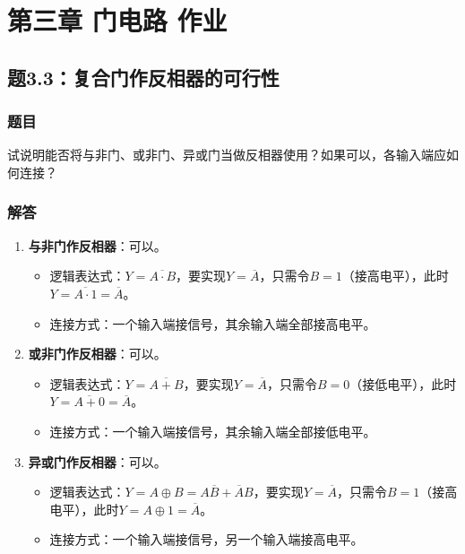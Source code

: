 
\section{第三章 门电路 作业}

\subsection{题3.3：复合门作反相器的可行性}
\subsubsection{题目}
试说明能否将与非门、或非门、异或门当做反相器使用？如果可以，各输入端应如何连接？

\subsubsection{解答}
\begin{enumerate}
    \item \textbf{与非门作反相器}：可以。
    \begin{itemize}
        \item 逻辑表达式：$Y = \overline{A \cdot B}$，要实现$Y = \overline{A}$，只需令$B = 1$（接高电平），此时$Y = \overline{A \cdot 1} = \overline{A}$。
        \item 连接方式：一个输入端接信号，其余输入端全部接高电平。
    \end{itemize}
    
    \item \textbf{或非门作反相器}：可以。
    \begin{itemize}
        \item 逻辑表达式：$Y = \overline{A + B}$，要实现$Y = \overline{A}$，只需令$B = 0$（接低电平），此时$Y = \overline{A + 0} = \overline{A}$。
        \item 连接方式：一个输入端接信号，其余输入端全部接低电平。
    \end{itemize}
    
    \item \textbf{异或门作反相器}：可以。
    \begin{itemize}
        \item 逻辑表达式：$Y = A \oplus B = A\overline{B} + \overline{A}B$，要实现$Y = \overline{A}$，只需令$B = 1$（接高电平），此时$Y = A \oplus 1 = \overline{A}$。
        \item 连接方式：一个输入端接信号，另一个输入端接高电平。
    \end{itemize}
\end{enumerate}

